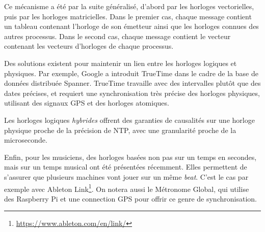 \documentclass[10pt]{article}
\begin{document}
Ce mécanisme a été par la suite généralisé, d'abord par les horloges vectorielles, puis par les horloges matricielles. 
Dans le premier cas, chaque message contient un tableau contenant l'horloge de son émetteur ainsi que les horloges connues des autres processus. Dans le second cas, chaque message contient le vecteur contenant les vecteurs d'horloges de chaque processus.

Des solutions existent pour maintenir un lien entre les horloges logiques et physiques. 
Par exemple, Google a introduit TrueTime dans le cadre de la base de données distribuée Spanner\cite{corbett2013spanner}. 
TrueTime travaille avec des intervalles plutôt que des dates précises, et requiert une synchronisation très précise des horloges physiques, utilisant des signaux GPS et des horloges atomiques.

Les horloges logiques \textit{hybrides}\cite{kulkarni2014logical} offrent des garanties de causalités sur une horloge physique proche de la précision de NTP, avec une granularité proche de la microseconde.

Enfin, pour les musiciens, des horloges basées non pas sur un temps en secondes, mais sur un temps musical ont été présentées récemment. Elles permettent de s'assurer que plusieurs machines vont jouer sur un même \textit{beat}. C'est le cas par exemple avec Ableton Link\footnote{\url{https://www.ableton.com/en/link/}}. 
On notera aussi le Métronome Global\cite{oda2016global}, qui utilise des Raspberry Pi et une connection GPS pour offrir ce genre de synchronisation.

\end{document}
